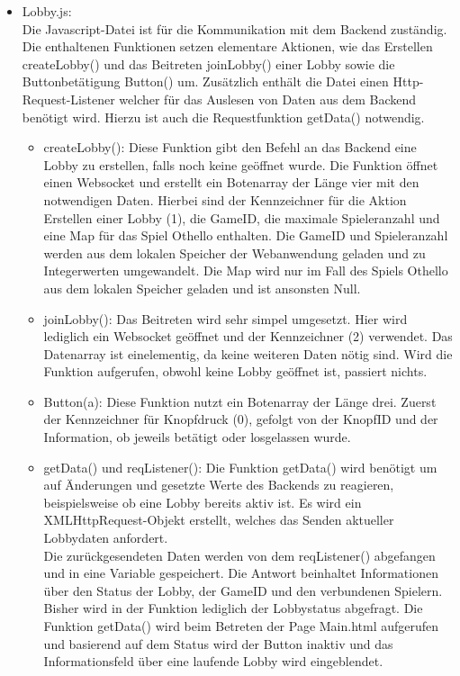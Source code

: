 \documentclass[12pt,a4paper]{article}
\begin{document}
\begin{itemize}
\item{Lobby.js:}\\
Die Javascript-Datei ist für die Kommunikation mit dem Backend zuständig. Die enthaltenen Funktionen setzen elementare Aktionen, wie das Erstellen \glqq createLobby()\grqq{} und das Beitreten \glqq joinLobby()\grqq{} einer Lobby sowie die Buttonbetätigung \glqq Button()\grqq{} um. Zusätzlich enthält die Datei einen \glqq Http-Request-Listener\grqq{} welcher für das Auslesen von Daten aus dem Backend benötigt wird. Hierzu ist auch die Requestfunktion \glqq getData()\grqq{} notwendig.
\begin{itemize}
\item{createLobby():}
Diese Funktion gibt den Befehl an das Backend eine Lobby zu erstellen, falls noch keine geöffnet wurde. Die Funktion öffnet einen Websocket und erstellt ein  Botenarray der Länge vier mit den notwendigen Daten. Hierbei sind der Kennzeichner für die Aktion \glqq Erstellen\grqq{} einer Lobby (1), die GameID, die maximale Spieleranzahl und eine Map für das Spiel Othello enthalten. Die GameID und Spieleranzahl werden aus dem lokalen Speicher der Webanwendung geladen und zu Integerwerten umgewandelt. Die Map wird nur im Fall des Spiels Othello aus dem lokalen Speicher geladen und ist ansonsten Null. 
\item{joinLobby():}
Das Beitreten wird sehr simpel umgesetzt. Hier wird lediglich ein Websocket geöffnet und der Kennzeichner (2) verwendet. Das Datenarray ist einelementig, da keine weiteren Daten nötig sind. Wird die Funktion aufgerufen, obwohl keine Lobby geöffnet ist, passiert nichts. 
\item{Button(a):} 
Diese Funktion nutzt ein Botenarray der Länge drei. Zuerst der Kennzeichner für Knopfdruck (0), gefolgt von der KnopfID und der Information, ob jeweils betätigt oder losgelassen wurde. 
\item{getData() und reqListener():}
Die Funktion getData() wird benötigt um auf Änderungen und gesetzte Werte des Backends zu reagieren, beispielsweise ob eine Lobby bereits aktiv ist. Es wird ein \glqq XMLHttpRequest\grqq -Objekt erstellt, welches das Senden aktueller Lobbydaten anfordert. 
\vspace{1.5ex}\\
Die zurückgesendeten Daten werden von dem reqListener() abgefangen und in eine Variable gespeichert. Die Antwort beinhaltet Informationen über den Status der Lobby, der GameID und den verbundenen Spielern. Bisher wird in der Funktion lediglich der Lobbystatus abgefragt. Die Funktion getData() wird beim Betreten der Page Main.html aufgerufen und basierend auf dem Status wird der Button inaktiv und das Informationsfeld über eine laufende Lobby wird eingeblendet. 
\end{itemize}
\end{itemize}
\end{document}
